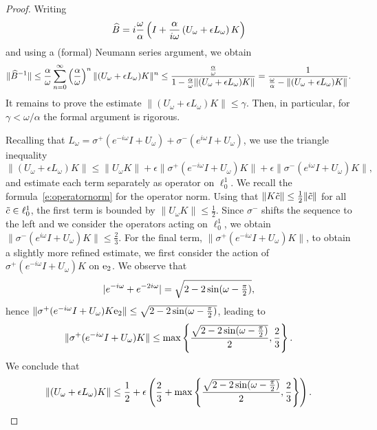 \begin{proof}
Writing 
\[
  \widehat{B}= i \frac{\omega}{\alpha} \left( I + \frac{\alpha}{i\omega} \left( U_{\omega} +  \epsilon L_{\omega} \right) K \right)
\]
and using a (formal) Neumann series argument, we obtain
\[
  \| \widehat{B}^{-1} \| \leq \frac{\alpha}{\omega}
   \sum_{n=0}^\infty \left( \frac{ \alpha}{ \omega} \right)^n \|(U_{\omega} + \epsilon L_{\omega}) K\|^n
   \leq \frac{\frac{\alpha}{\omega} }{1- \frac{ \alpha}{ \omega} \|(U_{\omega} + \epsilon L_{\omega}) K\|} 
   = \frac{1}{\frac{\omega}{\alpha}- \|(U_{\omega} + \epsilon L_{\omega}) K\|} .
\]
It remains to prove the estimate $\|(U_{\omega} + \epsilon L_{\omega}) K\| \leq \gamma$.
Then, in particular, for $\gamma < \omega/\alpha$ the formal argument is rigorous.

Recalling that $L_\omega= \sigma^+ (e^{-i\omega} I  + U_\omega) + \sigma^- (e^{i\omega} I  + U_\omega)$, we use the triangle inequality
\[
\|(U_{\omega} + \epsilon L_{\omega}) K\| 
\leq \| U_\omega K \|  + \epsilon \| \sigma^+ (e^{-i\omega} I  + U_\omega) K \| + \epsilon \| \sigma^- (e^{i\omega} I  + U_\omega) K \|,
\] 
and estimate each term separately as operator on $\ell^1_0$. 
We recall the formula~\eqref{e:operatornorm} for the operator norm.
Using that $\| K \tilde{c} \| \leq \frac{1}{2} \|\tilde{c}\|$ for all $\tilde{c} \in \ell^1_0$,
the first term is bounded by $\| U_\omega K \| \leq \frac{1}{2}$.
Since $\sigma^-$ shifts the sequence to the left and we consider the operators acting on $\ell^1_0$, we obtain $\| \sigma^- (e^{i\omega} I  + U_\omega) K \| \leq \frac{2}{3}$.
For the final term, $\| \sigma^+ (e^{-i\omega} I  + U_\omega) K \|$, 
to obtain a slightly more refined estimate,
we first consider the action of $\sigma^+ (e^{-i\omega} I  + U_\omega) K$ 
on $\mathrm{e}_2$. We observe that 
\[ 
  | e^{- i \omega} + e^{-2 i \omega}| = \sqrt{2 - 2 \sin (\omega-\tfrac{\pi}{2}) },
\]
hence $\| \sigma^+ (e^{-i\omega} I  + U_\omega) K \mathrm{e}_2 \| \leq 
\sqrt{2 - 2 \sin (\omega-\tfrac{\pi}{2}) } $, 
leading to
\[
 \| \sigma^+ (e^{-i\omega} I  + U_\omega) K \| 
 \leq \max\left\{  \frac{\sqrt{2 - 2 \sin (\omega-\tfrac{\pi}{2}) }}{2} ,\frac{2}{3} \right\}.
\]
We conclude that 
\[
\|(U_{\omega} + \epsilon L_{\omega}) K\| 
\leq 
  \frac{1}{2} +
  \epsilon \left( \frac{2}{3} + \max\left\{  \frac{\sqrt{2 - 2 \sin (\omega-\tfrac{\pi}{2}) }}{2} ,\frac{2}{3} \right\} \right).
\]
\end{proof}

